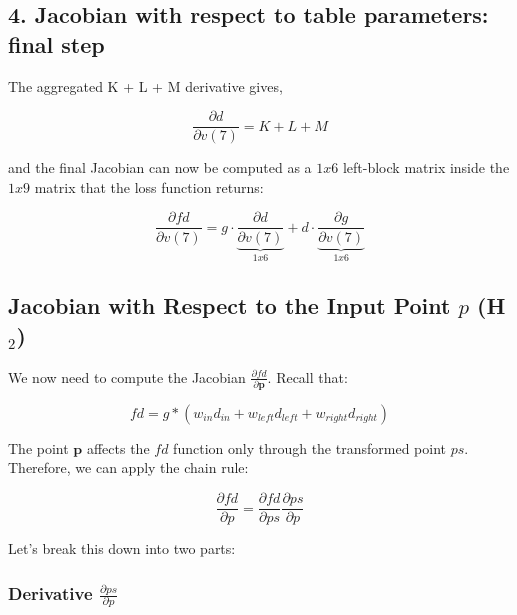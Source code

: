 \documentclass[11pt]{article}
\begin{document}
        \subsection*{4. Jacobian with respect to table parameters: final step}
            The aggregated K + L + M derivative gives,

            \begin{equation}
                \frac{\partial d}{\partial v(7)} = K + L + M
            \end{equation}

            and the final Jacobian can now be computed as a $1x6$ left-block matrix inside the $1x9$ matrix that the loss function returns:

            \begin{equation}
                \frac{\partial fd}{\partial v(7)} = g \cdot \underbrace{\frac{\partial d}{\partial v(7)}}_{1x6} + d \cdot \underbrace{\frac{\partial g}{\partial v(7)}}_{1x6}
            \end{equation}


        \subsection*{Jacobian with Respect to the Input Point \(p\) (H\(_2\))}

            We now need to compute the Jacobian $\frac{\partial fd}{\partial \mathbf{p}}$.
            Recall that:

            \begin{equation}
                fd = g * (w_{in} d_{in} + w_{left} d_{left} + w_{right} d_{right})
            \end{equation}

            The point $\mathbf{p}$ affects the $fd$ function only through the transformed point  $ps$.
            Therefore, we can apply the chain rule:

            \begin{equation}
                \frac{\partial fd}{\partial p} = \frac{\partial fd}{\partial ps} \frac{\partial ps}{\partial p}
            \end{equation}

            Let's break this down into two parts:

            \subsubsection*{Derivative $\frac{\partial ps}{\partial p}$}
\end{document}
